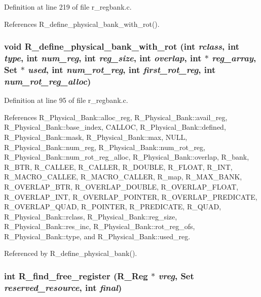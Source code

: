 Definition at line 219 of file r\_\-regbank.c.

References R\_\-define\_\-physical\_\-bank\_\-with\_\-rot().
\subsubsection{\setlength{\rightskip}{0pt plus 5cm}void R\_\-define\_\-physical\_\-bank\_\-with\_\-rot (int {\em rclass}, int {\em type}, int {\em num\_\-reg}, int {\em reg\_\-size}, int {\em overlap}, int $\ast$ {\em reg\_\-array}, \bf{Set} $\ast$ {\em used}, int {\em num\_\-rot\_\-reg}, int {\em first\_\-rot\_\-reg}, int {\em num\_\-rot\_\-reg\_\-alloc})}\label{r__regbank_8c_69e80ed4a57eb32d370ff3ae5ab42ceb}




Definition at line 95 of file r\_\-regbank.c.

References R\_\-Physical\_\-Bank::alloc\_\-reg, R\_\-Physical\_\-Bank::avail\_\-reg, R\_\-Physical\_\-Bank::base\_\-index, CALLOC, R\_\-Physical\_\-Bank::defined, R\_\-Physical\_\-Bank::mask, R\_\-Physical\_\-Bank::max, NULL, R\_\-Physical\_\-Bank::num\_\-reg, R\_\-Physical\_\-Bank::num\_\-rot\_\-reg, R\_\-Physical\_\-Bank::num\_\-rot\_\-reg\_\-alloc, R\_\-Physical\_\-Bank::overlap, R\_\-bank, R\_\-BTR, R\_\-CALLEE, R\_\-CALLER, R\_\-DOUBLE, R\_\-FLOAT, R\_\-INT, R\_\-MACRO\_\-CALLEE, R\_\-MACRO\_\-CALLER, R\_\-map, R\_\-MAX\_\-BANK, R\_\-OVERLAP\_\-BTR, R\_\-OVERLAP\_\-DOUBLE, R\_\-OVERLAP\_\-FLOAT, R\_\-OVERLAP\_\-INT, R\_\-OVERLAP\_\-POINTER, R\_\-OVERLAP\_\-PREDICATE, R\_\-OVERLAP\_\-QUAD, R\_\-POINTER, R\_\-PREDICATE, R\_\-QUAD, R\_\-Physical\_\-Bank::rclass, R\_\-Physical\_\-Bank::reg\_\-size, R\_\-Physical\_\-Bank::res\_\-inc, R\_\-Physical\_\-Bank::rot\_\-reg\_\-ofs, R\_\-Physical\_\-Bank::type, and R\_\-Physical\_\-Bank::used\_\-reg.

Referenced by R\_\-define\_\-physical\_\-bank().
\subsubsection{\setlength{\rightskip}{0pt plus 5cm}int R\_\-find\_\-free\_\-register (\bf{R\_\-Reg} $\ast$ {\em vreg}, \bf{Set} {\em reserved\_\-resource}, int {\em final})}\label{r__regbank_8c_280ac2e7a5d7fea0e22f8293451a51dc}




